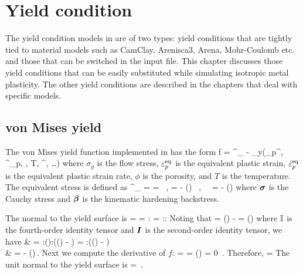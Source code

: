 \chapter{Yield condition}

The yield condition models in \Vaango are of two types: yield conditions that are
tightly tied to material models such as CamClay, Arenisca3, Arena, Mohr-Coulomb 
etc. and those that can be switched in the input file.  This chapter discusses
those yield conditions that can be easily substituted while simulating isotropic
metal plasticity.  The other yield conditions are described in the chapters that
deal with specific models.

\section{von Mises yield}
  The von Mises yield function implemented in \Vaango has the form
  \Beq
    f = \sigma^\xi_{\Teff} - \sigma_y(\Veps_p^\Teq, \dot{\Veps}^\Teq_p, \phi, T, \dot{\Veps}^\Teq, \dots)
  \Eeq 
  where $\sigma_y$ is the flow stress, $\varepsilon_p^{\text{eq}}$ is the equivalent plastic strain,
  $\dot{\varepsilon}^{\text{eq}}_p$ is the equivalent plastic strain rate, $\phi$ is the
  porosity, and $T$ is the temperature.  The equivalent stress is defined as
  \Beq \label{eq:equiv_stress}
    \sigma^\xi_{\Teff} =  =  ~,\quad
    \Bxi =  \BsT - \Dev(\Bbeta) ~,~~ \BsT = \Bsig - \Third \Tr(\Bsig)\BI
  \Eeq
  where $\boldsymbol{\sigma}$ is the Cauchy stress and $\boldsymbol{\beta}$ is the kinematic hardening backstress.

  The normal to the yield surface is 
  \Beq
    \BN = 
        = :\Partial{\Bxi}{\Bsig}
        = :\Partial{\Bxi}{\BsT}:\Partial{\BsT}{\Bsig}
  \Eeq
  Noting that
  \Beq
    \Partial{\BsT}{\Bsig} = \Tsym(\SfI) - \Third \BI\otimes\BI
    \quad \Tand \quad
    \Partial{\Bxi}{\BsT} = \Tsym(\SfI)
  \Eeq
  where $\boldsymbol{\mathbb{I}}$ is the fourth-order identity tensor and $\boldsymbol{I}$ is the second-order
  identity tensor, we have
  \Beq \label{eq:df_dxi}
    \Bal
      \BN & = :\Tsym(\SfI):(\Tsym(\SfI) - \Third \BI\otimes\BI)
            = :(\Tsym(\SfI) - \Third \BI\otimes\BI) \\
          & =  - \Third \Tr\left(\right)\BI \,.
    \Eal
  \Eeq
  Next we compute the derivative of $f$:
  \Beq
     =  \Partial{\sigma^\xi_\Teff}{\Bxi}
     =  \frac{\Bxi}{\sqrt{\Bxi:\Bxi}} 
    \quad \implies \quad
    \Tr\left(\right) = 0 \,.
  \Eeq
  Therefore,
  \Beq
    \BN =  \frac{\Bxi}{\Norm{\Bxi}{}}
  \Eeq
  The unit normal to the yield surface is
  \Beq
    \hat{\BN} = \frac{\Bxi}{\Norm{\Bxi}{}} \,.
  \Eeq
  
